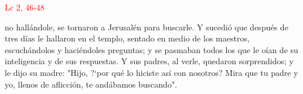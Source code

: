\hfill\textcolor{red}{Lc 2, 46-48}

 no hallándole, se tornaron a Jerusalén para buscarle. Y sucedió que después de tres días le hallaron en el templo,
sentado en medio de los maestros, escuchándolos y haciéndoles preguntas; y se pasmaban todos los que le oían de su inteligencia y de sus respuestas.
Y sus padres, al verle, quedaron sorprendidos; y le dijo su madre: "Hijo, {?`}por qué lo hiciste así con nosotros? Mira que tu padre y yo, llenos de aflicción, 
te andábamos buscando".